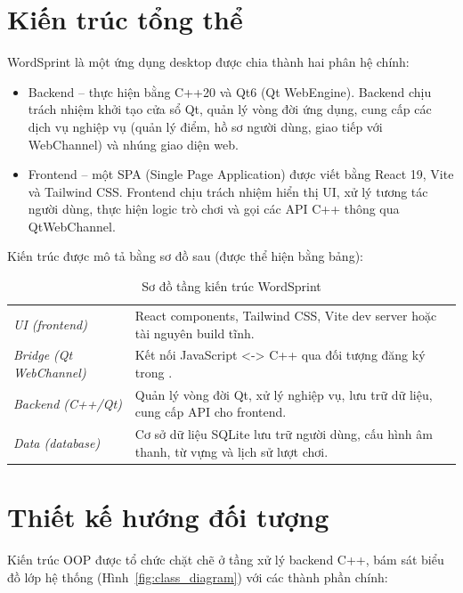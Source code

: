 \section{Kiến trúc tổng thể}
\label{sec:overall_architecture}
WordSprint là một ứng dụng desktop được chia thành hai phân hệ chính:
\begin{itemize}
    \item Backend – thực hiện bằng C++20 và Qt6 (Qt WebEngine). Backend chịu trách nhiệm khởi tạo cửa sổ Qt, quản lý vòng đời ứng dụng, cung cấp các dịch vụ nghiệp vụ (quản lý điểm, hồ sơ người dùng, giao tiếp với WebChannel) và nhúng giao diện web.
    \item Frontend – một SPA (Single Page Application) được viết bằng React 19, Vite và Tailwind CSS. Frontend chịu trách nhiệm hiển thị UI, xử lý tương tác người dùng, thực hiện logic trò chơi và gọi các API C++ thông qua QtWebChannel.
\end{itemize}
Kiến trúc được mô tả bằng sơ đồ sau (được thể hiện bằng bảng):

\begin{table}[h!]
\centering
\caption{Sơ đồ tầng kiến trúc WordSprint}
\label{tab:architecture_layers}
\begin{tabularx}{\textwidth}{|L{4.2cm}|Y|}
\hline
{} &  \\ \hline
\textit{UI (frontend)} & React components, Tailwind CSS, Vite dev server hoặc tài nguyên build tĩnh. \\ \hline
\textit{Bridge (Qt WebChannel)} & Kết nối JavaScript <-> C++ qua đối tượng đăng ký trong . \\ \hline
\textit{Backend (C++/Qt)} & Quản lý vòng đời Qt, xử lý nghiệp vụ, lưu trữ dữ liệu, cung cấp API cho frontend. \\ \hline
\textit{Data (database)} & Cơ sở dữ liệu SQLite lưu trữ người dùng, cấu hình âm thanh, từ vựng và lịch sử lượt chơi. \\ \hline
\end{tabularx}
\end{table}

\section{Thiết kế hướng đối tượng}
\label{sec:oop_design}
Kiến trúc OOP được tổ chức chặt chẽ ở tầng xử lý backend C++, bám sát biểu đồ lớp hệ thống (Hình~\ref{fig:class_diagram}) với các thành phần chính:

